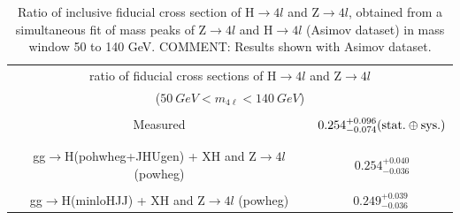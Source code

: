 \begin{table}[!h!tb]
\begin{center}
      \caption{
Ratio of inclusive fiducial cross section of H$\rightarrow 4l$ and Z$\rightarrow 4l$, obtained
from a simultaneous fit of mass peaks of Z$\rightarrow 4l$ and H$\rightarrow 4l$ (Asimov dataset) in mass window 50 to 140 GeV.
    COMMENT: Results shown with Asimov dataset.
        } \label{tab:incresults-simfit-asimov}
\begin{tabular}{|c|c|}
\hline %
\hline %
\multicolumn{2}{|c|}{ ratio of fiducial cross sections of H$\rightarrow 4l$ and Z$\rightarrow 4l$} \\
\multicolumn{2}{|c|}{($50~GeV < m_{4\ell} < 140~GeV$)} \\
\hline %
\vspace{-0.4cm} & \\
Measured & $0.254^{+0.096}_{-0.074}({\rm stat.}\oplus{\rm sys.})$  \\
\vspace{-0.4cm} & \\
\hline %
\vspace{-0.4cm} & \\
\small gg$\rightarrow$H({\sc pohwheg+JHUgen}) + XH and Z$\rightarrow 4l$ ({\sc powheg}) & $ 0.254^{+0.040}_{-0.036}$ \\
\hline %
\vspace{-0.4cm} & \\
\small gg$\rightarrow$H({\sc minloHJJ}) + XH and Z$\rightarrow 4l$ ({\sc powheg}) & $ 0.249^{+0.039}_{-0.036}~$ \\
\hline %
\hline %
\end{tabular}
\end{center}
\end{table}

